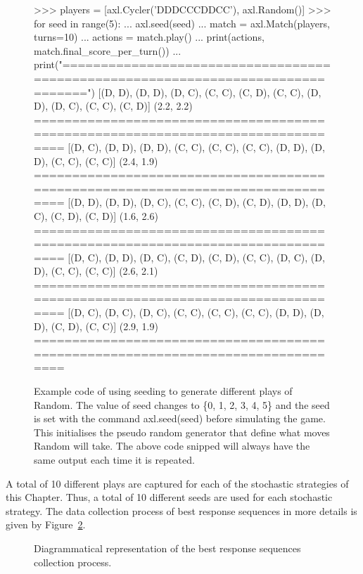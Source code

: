 \begin{figure}[!htbp]
    \begin{usagepy}
>>> players = [axl.Cycler('DDDCCCDDCC'), axl.Random()]
>>> for seed in range(5):
...   axl.seed(seed)
...   match = axl.Match(players, turns=10)
...   actions = match.play()
...   print(actions, match.final_score_per_turn())
...   print("================================================================================")
[(D, D), (D, D), (D, C), (C, C), (C, D), (C, C), (D, D), (D, C), (C, C), (C, D)] (2.2, 2.2)
================================================================================
[(D, C), (D, D), (D, D), (C, C), (C, C), (C, C), (D, D), (D, D), (C, C), (C, C)] (2.4, 1.9)
================================================================================
[(D, D), (D, D), (D, C), (C, C), (C, D), (C, D), (D, D), (D, C), (C, D), (C, D)] (1.6, 2.6)
================================================================================
[(D, C), (D, D), (D, C), (C, D), (C, D), (C, C), (D, C), (D, D), (C, C), (C, C)] (2.6, 2.1)
================================================================================
[(D, C), (D, C), (D, C), (C, C), (C, C), (C, C), (D, D), (D, D), (C, D), (C, C)] (2.9, 1.9)
================================================================================

\end{usagepy}
\caption{Example code of using seeding to generate different plays of Random.
The value of seed changes to \{0, 1, 2, 3, 4, 5\} and the seed is set with
the command axl.seed(seed) before simulating the game. This initialises the
pseudo random generator that define what moves Random will take.
The above code snipped will always have the same output each time it is
repeated.}\label{fig:random_apl_example}
\end{figure}

A total of 10 different plays are captured for each of the stochastic strategies
of this Chapter. Thus, a total of 10 different seeds are used for each stochastic
strategy.
The data collection process of best response sequences in more details is given
by Figure~\ref{fig:data_generating_process_diagram}.

\begin{figure}[!htbp]
    \centering
    
    \caption{Diagrammatical representation of the best response
    sequences collection process.}\label{fig:data_generating_process_diagram}
\end{figure}

